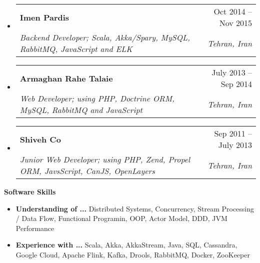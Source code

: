 \documentclass[letterpaper,12pt]{article}[leftmargin=*]
\makeatletter
\def \entryspacing {-0pt}
\renewcommand{\section}[2]{\vspace{5pt}
  \colorbox{secondary}{\color{white}\raggedbottom\normalsize\textbf{{#1}{\hspace{7pt}#2}}}
}
\newcommand{\resumeEntryStart}{\begin{itemize}[leftmargin=2.5mm]}
\newcommand{\resumeEntryEnd}{\end{itemize}\vspace{\entryspacing}}
\newcommand{\resumeItemListStart}{\begin{itemize}[leftmargin=4.5mm]}
\newcommand{\resumeItemListEnd}{\end{itemize}}
\newcommand{\resumeItem}[1]{
  \item\small{
    {#1 \vspace{-2pt}}
  }
}
\newcommand{\resumeEntryTSDL}[4]{
  \vspace{-1pt}\item[]
    \begin{tabular*}{0.97\textwidth}{l@{\extracolsep{\fill}}r}
      \textbf{\color{primary}#1} & {\firabook\color{accent}\small#2} \\
      \textit{\color{accent}\small#3} & \textit{\color{accent}\small#4} \\
    \end{tabular*}\vspace{-6pt}
}
\newcommand{\resumeEntryS}[2]{
  \item[]\small{
    \textbf{\color{primary}#1 }{ #2 \vspace{-6pt}}
  }
}
\makeatother
\begin{document}
  \resumeEntryStart
    \resumeEntryTSDL
	  {Imen Pardis}{Oct 2014 -- Nov 2015}
      {Backend Developer; Scala, Akka/Spary, MySQL, RabbitMQ, JavaScript and ELK}{Tehran, Iran}
  \resumeEntryEnd

\vspace{-13pt} %

  \resumeEntryStart
    \resumeEntryTSDL
      {Armaghan Rahe Talaie}{July 2013 -- Sep 2014}
      {Web Developer; using PHP, Doctrine ORM, MySQL, RabbitMQ and JavaScript}{Tehran, Iran}
  \resumeEntryEnd

\vspace{-13pt} %

  \resumeEntryStart
    \resumeEntryTSDL
      {Shiveh Co}{Sep 2011 -- July 2013}
      {Junior Web Developer; using PHP, Zend, Propel ORM, JavsScript, CanJS, OpenLayers}{Tehran, Iran}
  \resumeEntryEnd

\section{\faGears}{Software Skills}
 \resumeEntryStart
  \resumeEntryS{Understanding of ... } {Distributed Systems, Concurrency, Stream Processing / Data Flow, Functional Programin, OOP, Actor Model, DDD, JVM Performance}
  \resumeEntryS{Experience with ... } {Scala, Akka, AkkaStream, Java, SQL, Cassandra, Google Cloud, Apache Flink, Kafka, Drools, RabbitMQ, Docker, ZooKeeper}
 \resumeEntryEnd
  
\end{document}
